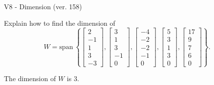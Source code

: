 \begin{exercise}
  \begin{exerciseTitle}V8 - Dimension (ver. 158)\end{exerciseTitle}
  \begin{exerciseStatement}
    Explain how to find the dimension of 
\[W=\mathrm{span}\ \left\{\left[\begin{array}{r}
2 \\
-1 \\
1 \\
3 \\
-3
\end{array}\right] , \left[\begin{array}{r}
3 \\
1 \\
3 \\
-1 \\
0
\end{array}\right] , \left[\begin{array}{r}
-4 \\
-2 \\
-2 \\
-1 \\
0
\end{array}\right] , \left[\begin{array}{r}
5 \\
3 \\
1 \\
3 \\
0
\end{array}\right] , \left[\begin{array}{r}
17 \\
9 \\
7 \\
6 \\
0
\end{array}\right]\right\}.\]



  \end{exerciseStatement}
  \begin{exerciseAnswer}
   The dimension of \(W\) is  \(3\).
  


  \end{exerciseAnswer}
\end{exercise}